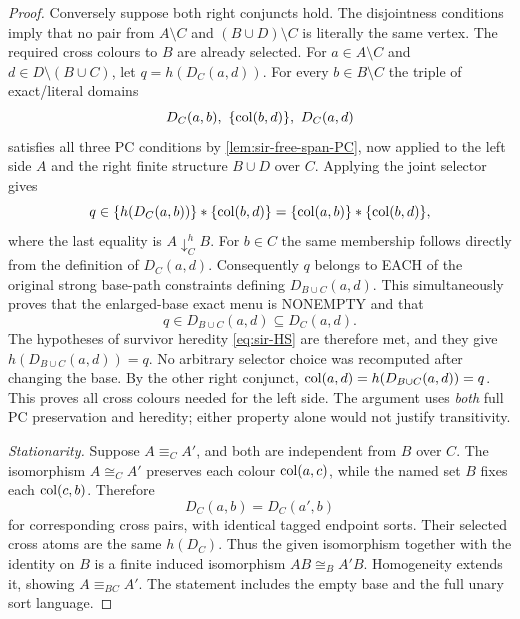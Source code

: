 \begin{proof}
Conversely suppose both right
conjuncts hold. The disjointness
conditions imply that no pair
from \(A\setminus C\) and
\((B\cup D)\setminus C\)
is literally the same vertex.
The required cross colours
to \(B\) are already selected.
For \(a\in A\setminus C\)
and \(d\in D\setminus(B\cup C)\),
let \(q=h(D_C(a,d))\).
For every \(b\in B\setminus C\)
the triple of exact/literal
domains
\[
  D_C(a,b),\
  \{\operatorname{col}(b,d)\},\
  D_C(a,d)
\]
satisfies all three PC
conditions by
\cref{lem:sir-free-span-PC},
now applied to the left side
\(A\) and the right finite
structure \(B\cup D\) over
\(C\). Applying the joint
selector gives
\[
 q\in
   \{h(D_C(a,b))\}*
   \{\operatorname{col}(b,d)\}
 = \{\operatorname{col}(a,b)\}*
   \{\operatorname{col}(b,d)\},
\]
where the last equality is
\(A\downarrow_C^h B\).
For \(b\in C\) the same
membership follows directly
from the definition of
\(D_C(a,d)\). Consequently
\(q\) belongs to EACH of the
original strong base-path
constraints defining
\(D_{B\cup C}(a,d)\).
This simultaneously proves
that the enlarged-base exact
menu is NONEMPTY and that
\[
  q\in D_{B\cup C}(a,d)
                  \subseteq D_C(a,d).
\]
The hypotheses of survivor
heredity
\eqref{eq:sir-HS} are therefore
met, and they give
\(h(D_{B\cup C}(a,d))=q\).
No arbitrary selector choice
was recomputed after changing
the base.
By the other right conjunct,
\(\operatorname{col}(a,d)=h(D_{B\cup C}(a,d))=q\).
This proves all cross colours
needed for the left side.
The argument uses \emph{both}
full PC preservation and
heredity; either property alone
would not justify transitivity.

\emph{Stationarity.}
Suppose \(A\equiv_C A'\),
and both are independent
from \(B\) over \(C\).
The isomorphism \(A\cong_C A'\)
preserves each colour
\(\operatorname{col}(a,c)\), while the
named set \(B\) fixes
each \(\operatorname{col}(c,b)\). Therefore
\[
 D_C(a,b)=D_C(a',b)
\]
for corresponding cross
pairs, with identical tagged
endpoint sorts. Their selected
cross atoms are the same
\(h(D_C)\). Thus the given
isomorphism together with
the identity on \(B\) is
a finite induced isomorphism
\(AB\cong_B A'B\).
Homogeneity extends it,
showing \(A\equiv_{BC}A'\).
The statement includes the
empty base and the full
unary sort language.
\end{proof}

